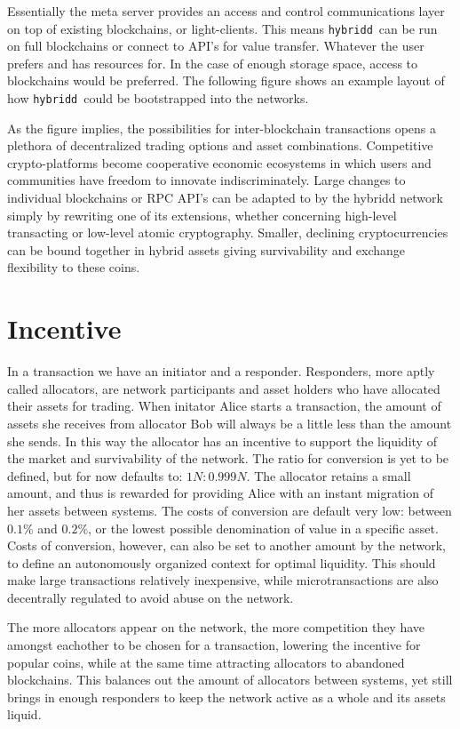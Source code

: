\documentclass[11pt, a4paper]{article}
\newcommand{\hybridd}{\texttt{hybridd}\, }
\begin{document}
Essentially the meta server provides an access and control communications layer on top of existing blockchains, or light-clients. This means \hybridd can be run on full blockchains or connect to API's for value transfer. Whatever the user prefers and has resources for. In the case of enough storage space, access to blockchains would be preferred. The following figure shows an example layout of how \hybridd could be bootstrapped into the networks.

As the figure implies, the possibilities for inter-blockchain transactions opens a plethora of decentralized trading options and asset combinations. Competitive crypto-platforms become cooperative economic ecosystems in which users and communities have freedom to innovate indiscriminately. Large changes to individual blockchains or RPC API's can be adapted to by the hybridd network simply by rewriting one of its extensions, whether concerning high-level transacting or low-level atomic cryptography. Smaller, declining cryptocurrencies can be bound together in hybrid assets giving survivability and exchange flexibility to these coins.


\section{Incentive}

In a transaction we have an initiator and a responder. Responders, more aptly called allocators, are network participants and asset holders who have allocated their assets for trading. When initator Alice starts a transaction, the amount of assets she receives from allocator Bob will always be a little less than the amount she sends. In this way the allocator has an incentive to support the liquidity of the market and survivability of the network. The ratio for conversion is yet to be defined, but for now defaults to: $1N : 0.999N$.  The allocator retains a small amount, and thus is rewarded for providing Alice with an instant migration of her assets between systems. The costs of conversion are default very low: between $0.1\%$ and $0.2\%$, or the lowest possible denomination of value in a specific asset. Costs of conversion, however, can also be set to another amount by the network, to define an autonomously organized context for optimal liquidity. This should make large transactions relatively inexpensive, while microtransactions are also decentrally regulated to avoid abuse on the network.

The more allocators appear on the network, the more competition they have amongst eachother to be chosen for a transaction, lowering the incentive for popular coins, while at the same time attracting allocators to abandoned blockchains. This balances out the amount of allocators between systems, yet still brings in enough responders to keep the network active as a whole and its assets liquid.
\end{document}
